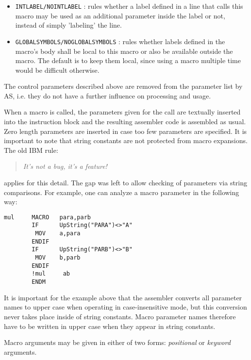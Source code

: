 \documentclass[12pt,twoside]{report}
\newcommand{\tty}[1]{{\tt #1}}
\begin{document}
\begin{itemize}
{      shall be written to a separate file in case the \tty{-M} command line
      option was given.  This way, definitions of 'private' macros may
      be mapped out selectively.  The default is FALSE, i.e. the
      definition will not be written to the file.  The macro will be
      written with the concatenated name if the \tty{GLOBAL} option was
      additionally present.}
\item{\tty{INTLABEL/NOINTLABEL} : rules whether a label defined in a line
      that calls this macro may be used as an additional parameter inside
      the label or not, instead of simply 'labeling' the line.}
\item{\tty{GLOBALSYMBOLS/NOGLOBALSYMBOLS} : rules whether labels
      defined in the macro's body shall be local to this macro or
      also be available outside the macro.  The default is to
      keep them local, since using a macro multiple time would be
      difficult otherwise.}
\end{itemize}
The control parameters described above are removed from the parameter
list by AS, i.e. they do not have a further influence on processing
and usage.

When a macro is called, the parameters given for the call are
textually inserted into the instruction block and the resulting
assembler code is assembled as usual.  Zero length parameters are
inserted in case too few parameters are specified.  It is important
to note that string constants are not protected from macro
expansions.  The old IBM rule:
\begin{quote}{\it
 It's not a bug, it's a feature!
}\end{quote}
applies for this detail.  The gap was left to allow checking of
parameters via string comparisons.  For example, one can analyze a
macro parameter in the following way:
\begin{verbatim}
mul     MACRO   para,parb
        IF      UpString("PARA")<>"A"
         MOV    a,para
        ENDIF
        IF      UpString("PARB")<>"B"
         MOV    b,parb
        ENDIF
        !mul     ab
        ENDM
\end{verbatim}
It is important for the example above that the assembler converts all
parameter names to upper case when operating in case-insensitive
mode, but this conversion never takes place inside of string constants.
Macro parameter names therefore have to be written in upper case when
they appear in string constants.

Macro arguments may be given in either of two forms: {\em
positional} or {\em keyword} arguments.
\end{document}
